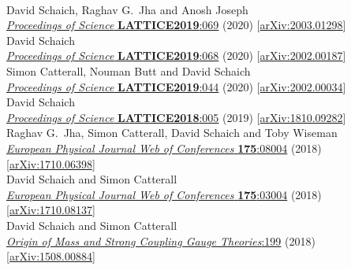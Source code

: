 \begin{spacelist}
\begin{revnumerate}
    \pagebreakitem
       \\
      David Schaich, Raghav G.~Jha and Anosh Joseph \\
      \href{https://doi.org/10.22323/1.363.0069}{\textit{Proceedings of Science} \textbf{LATTICE2019}:069} (2020) [\href{http://arxiv.org/abs/2003.01298}{arXiv:2003.01298}]
    \pagebreakitem
       \\
      David Schaich \\
      \href{https://doi.org/10.22323/1.363.0068}{\textit{Proceedings of Science} \textbf{LATTICE2019}:068} (2020) [\href{http://arxiv.org/abs/2002.00187}{arXiv:2002.00187}]
    \pagebreakitem
       \\
      Simon Catterall, Nouman Butt and David Schaich \\
      \href{https://doi.org/10.22323/1.363.0044}{\textit{Proceedings of Science} \textbf{LATTICE2019}:044} (2020) [\href{http://arxiv.org/abs/2002.00034}{arXiv:2002.00034}]
    \pagebreakitem
       \\
      David Schaich \\
      \href{https://doi.org/10.22323/1.334.0005}{\textit{Proceedings of Science} \textbf{LATTICE2018}:005} (2019) [\href{http://arxiv.org/abs/1810.09282}{arXiv:1810.09282}]
    \pagebreakitem
       \\
      Raghav G.~Jha, Simon Catterall, David Schaich and Toby Wiseman \\
      \href{https://doi.org/10.1051/epjconf/201817508004}{\textit{European Physical Journal Web of Conferences} \textbf{175}:08004} (2018) [\href{http://arxiv.org/abs/1710.06398}{arXiv:1710.06398}]
    \pagebreakitem
       \\
      David Schaich and Simon Catterall \\
      \href{https://doi.org/10.1051/epjconf/201817503004}{\textit{European Physical Journal Web of Conferences} \textbf{175}:03004} (2018) [\href{http://arxiv.org/abs/1710.08137}{arXiv:1710.08137}]
    \pagebreakitem
       \\
      David Schaich and Simon Catterall \\
      \href{http://dx.doi.org/10.1142/9789813231467_0028}{\textit{Origin of Mass and Strong Coupling Gauge Theories}:199} (2018) [\href{http://arxiv.org/abs/1508.00884}{arXiv:1508.00884}] \\

\end{revnumerate}
\end{spacelist}
